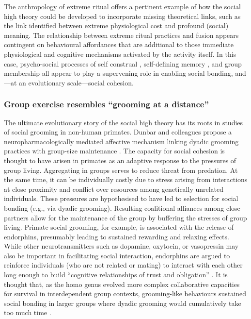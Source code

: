 The anthropology of extreme ritual offers a pertinent example of how the social high theory could be developed to incorporate missing theoretical links, such as the link identified between extreme physiological cost and profound (social) meaning.  The relationship between extreme ritual practices and fusion appears contingent on behavioural affordances that are additional to those immediate physiological and cognitive mechanisms activated by the activity itself.  In this case, psycho-social processes of self construal \citep{Markus2003}, self-defining memory \citep[cf.][]{Moffitt1994}, and group membership \citep{Tajfel1971,Turner1987,Swann2009} all appear to play a supervening role in enabling social bonding, and---at an evolutionary scale---social cohesion.




\subsubsection{Group exercise resembles ``grooming at a distance''}
The ultimate evolutionary story of the social high theory has its roots in studies of social grooming in non-human primates. Dunbar and colleagues propose a neuropharmacologically mediated affective mechanism linking dyadic grooming practices with group-size maintenance \citep{Machin2011}.  The capacity for social cohesion is thought to have arisen in primates as an adaptive response to the pressures of group living.  Aggregating in groups serves to reduce threat from predation.  At the same time, it can be individually costly due to stress arising from interactions at close proximity and conflict over resources among genetically unrelated individuals.  These pressures are hypothesised to have led to selection for social bonding (e.g., via dyadic grooming).  Resulting coalitional alliances among close partners allow for the maintenance of the group by buffering the stresses of group living.  Primate social grooming, for example, is associated with the release of endorphins, presumably leading to sustained rewarding and relaxing effects.  While other neurotransmitters such as dopamine, oxytocin, or vasopressin may also be important in facilitating social interaction, endorphins are argued to reinforce individuals (who are not related or mating) to interact with each other long enough to build ``cognitive relationships of trust and obligation'' \citep[1839]{Dunbar2012}.  It is thought that, as the homo genus evolved more complex collaborative capacities for survival in interdependent group contexts, grooming-like behaviours sustained social bonding in larger groups where dyadic grooming would cumulatively take too much time \citep{Dunbar2012}.

